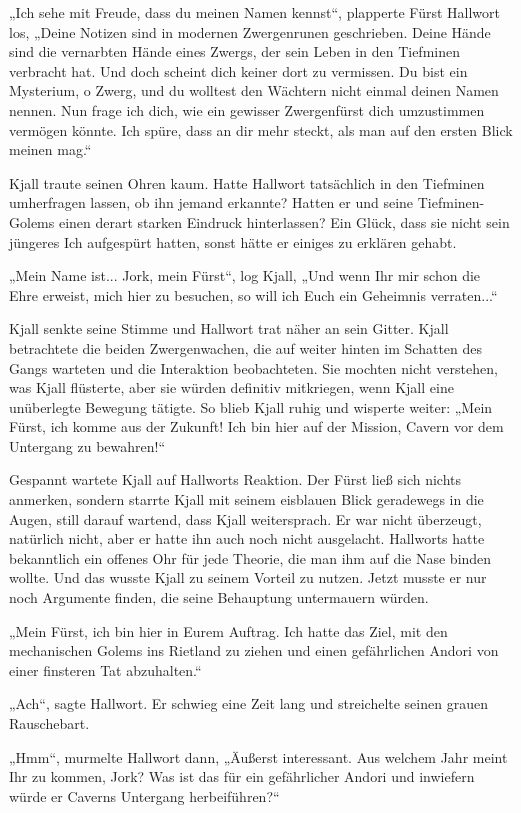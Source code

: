 „Ich sehe mit Freude, dass du meinen Namen kennst“, plapperte Fürst Hallwort los, „Deine Notizen sind in modernen Zwergenrunen geschrieben. Deine Hände sind die vernarbten Hände eines Zwergs, der sein Leben in den Tiefminen verbracht hat. Und doch scheint dich keiner dort zu vermissen. Du bist ein Mysterium, o Zwerg, und du wolltest den Wächtern nicht einmal deinen Namen nennen. Nun frage ich dich, wie ein gewisser Zwergenfürst dich umzustimmen vermögen könnte. Ich spüre, dass an dir mehr steckt, als man auf den ersten Blick meinen mag.“

Kjall traute seinen Ohren kaum. Hatte Hallwort tatsächlich in den Tiefminen umherfragen lassen, ob ihn jemand erkannte? Hatten er und seine Tiefminen-Golems einen derart starken Eindruck hinterlassen? Ein Glück, dass sie nicht sein jüngeres Ich aufgespürt hatten, sonst hätte er einiges zu erklären gehabt.

„Mein Name ist... Jork, mein Fürst“, log Kjall, „Und wenn Ihr mir schon die Ehre erweist, mich hier zu besuchen, so will ich Euch ein Geheimnis verraten...“

Kjall senkte seine Stimme und Hallwort trat näher an sein Gitter. Kjall betrachtete die beiden Zwergenwachen, die auf weiter hinten im Schatten des Gangs warteten und die Interaktion beobachteten. Sie mochten nicht verstehen, was Kjall flüsterte, aber sie würden definitiv mitkriegen, wenn Kjall eine unüberlegte Bewegung tätigte. So blieb Kjall ruhig und wisperte weiter: „Mein Fürst, ich komme aus der Zukunft! Ich bin hier auf der Mission, Cavern vor dem Untergang zu bewahren!“

Gespannt wartete Kjall auf Hallworts Reaktion. Der Fürst ließ sich nichts anmerken, sondern starrte Kjall mit seinem eisblauen Blick geradewegs in die Augen, still darauf wartend, dass Kjall weitersprach. Er war nicht überzeugt, natürlich nicht, aber er hatte ihn auch noch nicht ausgelacht. Hallworts hatte bekanntlich ein offenes Ohr für jede Theorie, die man ihm auf die Nase binden wollte. Und das wusste Kjall zu seinem Vorteil zu nutzen. Jetzt musste er nur noch Argumente finden, die seine Behauptung untermauern würden.

„Mein Fürst, ich bin hier in Eurem Auftrag. Ich hatte das Ziel, mit den mechanischen Golems ins Rietland zu ziehen und einen gefährlichen Andori von einer finsteren Tat abzuhalten.“

„Ach“, sagte Hallwort. Er schwieg eine Zeit lang und streichelte seinen grauen Rauschebart.

„Hmm“, murmelte Hallwort dann, „Äußerst interessant. Aus welchem Jahr meint Ihr zu kommen, Jork? Was ist das für ein gefährlicher Andori und inwiefern würde er Caverns Untergang herbeiführen?“

